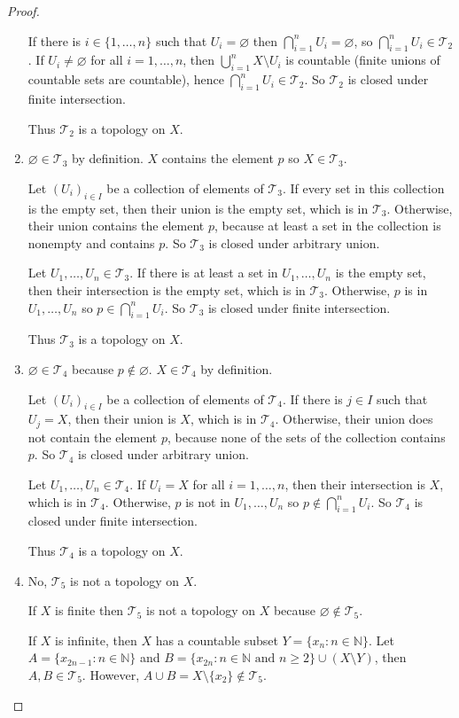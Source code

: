 \begin{proof}
\begin{enumerate}[label={(\alph*)}]
		      If there is $i \in \{1,\ldots,n\}$ such that $U_{i} = \varnothing$ then $\bigcap^{n}_{i=1}U_{i} = \varnothing$, so $\bigcap^{n}_{i=1}U_{i}\in\mathscr{T}_{2}$.  If $U_{i}\ne\varnothing$ for all $i=1,\ldots,n$, then $\bigcup^{n}_{i=1}X\setminus U_{i}$ is countable (finite unions of countable sets are countable), hence $\bigcap^{n}_{i=1}U_{i}\in\mathscr{T}_{2}$. So $\mathscr{T}_{2}$ is closed under finite intersection.

		      Thus $\mathscr{T}_{2}$ is a topology on $X$.
		\item $\varnothing\in\mathscr{T}_{3}$ by definition. $X$ contains the element $p$ so $X\in\mathscr{T}_{3}$.

		      Let ${(U_{i})}_{i\in I}$ be a collection of elements of $\mathscr{T}_{3}$. If every set in this collection is the empty set, then their union is the empty set, which is in $\mathscr{T}_{3}$. Otherwise, their union contains the element $p$, because at least a set in the collection is nonempty and contains $p$. So $\mathscr{T}_{3}$ is closed under arbitrary union.

		      Let $U_{1}, \ldots, U_{n}\in\mathscr{T}_{3}$. If there is at least a set in $U_{1}, \ldots, U_{n}$ is the empty set, then their intersection is the empty set, which is in $\mathscr{T}_{3}$. Otherwise, $p$ is in $U_{1}, \ldots, U_{n}$ so $p\in \bigcap^{n}_{i=1}U_{i}$. So $\mathscr{T}_{3}$ is closed under finite intersection.

		      Thus $\mathscr{T}_{3}$ is a topology on $X$.
		\item $\varnothing\in\mathscr{T}_{4}$ because $p\notin \varnothing$. $X\in\mathscr{T}_{4}$ by definition.

		      Let ${(U_{i})}_{i\in I}$ be a collection of elements of $\mathscr{T}_{4}$. If there is $j\in I$ such that $U_{j} = X$, then their union is $X$, which is in $\mathscr{T}_{4}$. Otherwise, their union does not contain the element $p$, because none of the sets of the collection contains $p$. So $\mathscr{T}_{4}$ is closed under arbitrary union.

		      Let $U_{1}, \ldots, U_{n}\in\mathscr{T}_{4}$. If $U_{i} = X$ for all $i = 1,\ldots, n$, then their intersection is $X$, which is in $\mathscr{T}_{4}$. Otherwise, $p$ is not in $U_{1}, \ldots, U_{n}$ so $p\notin \bigcap^{n}_{i=1}U_{i}$. So $\mathscr{T}_{4}$ is closed under finite intersection.

		      Thus $\mathscr{T}_{4}$ is a topology on $X$.
		\item No, $\mathscr{T}_{5}$ is not a topology on $X$.

		      If $X$ is finite then $\mathscr{T}_{5}$ is not a topology on $X$ because $\varnothing\notin\mathscr{T}_{5}$.

		      If $X$ is infinite, then $X$ has a countable subset $Y = \{ x_{n} : n\in\mathbb{N} \}$. Let $A = \{ x_{2n-1}: n\in\mathbb{N} \}$ and $B = \{ x_{2n} : n\in\mathbb{N} \text{ and } n\geq 2 \}\cup (X\setminus Y)$, then $A, B\in\mathscr{T}_{5}$. However, $A\cup B = X\setminus\{x_{2}\}\notin \mathscr{T}_{5}$.
	\end{enumerate}
\end{proof}

